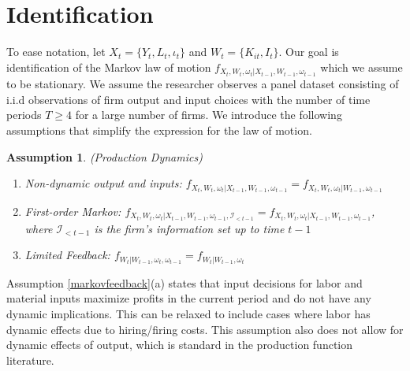 \documentclass{article}
\newtheorem{assump}{Assumption}[section]
\begin{document}
\section{Identification}

To ease notation, let $X_{t}=\{Y_{t}, L_{t}, \iota_{t}\}$ and $W_{t}=\{K_{it}, I_{t}\}$. Our goal is identification of the Markov law of motion $f_{X_{t}, W_{t}, \omega_{t}|X_{t-1}, W_{t-1}, \omega_{t-1}}$ which we assume to be stationary. We assume the researcher observes a panel dataset consisting of i.i.d observations of firm output and input choices with the number of time periods $T\geq 4$ for a large number of firms. We introduce the following assumptions that simplify the expression for the law of motion. 

\begin{assump}(Production Dynamics)\label{markovfeedback}
~
    \begin{enumerate}[label=\alph*)]
        \item \textit{Non-dynamic output and inputs:} $f_{X_{t}, W_{t}, \omega_{t}|X_{t-1}, W_{t-1}, \omega_{t-1}}=f_{X_{t}, W_{t}, \omega_{t}|W_{t-1}, \omega_{t-1}}$
        \item \textit{First-order Markov:} $f_{X_{t}, W_{t}, \omega_{t}|X_{t-1}, W_{t-1}, \omega_{t-1}, \mathcal{I}_{<t-1}}=f_{X_{t}, W_{t}, \omega_{t}|X_{t-1}, W_{t-1}, \omega_{t-1}}$, where $\mathcal{I}_{<t-1}$ is the firm's information set up to time $t-1$
        \item \textit{Limited Feedback:} $f_{W_{t}|W_{t-1}, \omega_{t}, \omega_{t-1}}=f_{W_{t}|W_{t-1}, \omega_{t}}$ 
    \end{enumerate}
\end{assump}

Assumption \eqref{markovfeedback}(a) states that input decisions for labor and material inputs maximize profits in the current period and do not have any dynamic implications. This can be relaxed to include cases where labor has dynamic effects due to hiring/firing costs. This assumption also does not allow for dynamic effects of output, which is standard in the production function literature.\\ 
\end{document}
